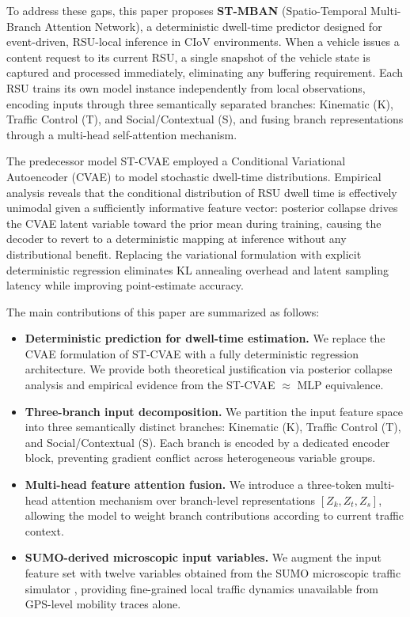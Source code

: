 \documentclass[journal]{IEEEtran}
\begin{document}
To address these gaps, this paper proposes \textbf{ST-MBAN} (Spatio-Temporal Multi-Branch Attention Network), a deterministic dwell-time predictor designed for event-driven, RSU-local inference in CIoV environments.
When a vehicle issues a content request to its current RSU, a single snapshot of the vehicle state is captured and processed immediately, eliminating any buffering requirement.
Each RSU trains its own model instance independently from local observations, encoding inputs through three semantically separated branches: Kinematic (K), Traffic Control (T), and Social/Contextual (S), and fusing branch representations through a multi-head self-attention mechanism.

\IEEEpubidadjcol
The predecessor model ST-CVAE \cite{STCVAE} employed a Conditional Variational Autoencoder (CVAE) to model stochastic dwell-time distributions.
Empirical analysis reveals that the conditional distribution of RSU dwell time is effectively unimodal given a sufficiently informative feature vector: posterior collapse \cite{posteriorCollapse} drives the CVAE latent variable toward the prior mean during training, causing the decoder to revert to a deterministic mapping at inference without any distributional benefit.
Replacing the variational formulation with explicit deterministic regression eliminates KL annealing overhead and latent sampling latency while improving point-estimate accuracy.

The main contributions of this paper are summarized as follows:

\begin{itemize}
    \item \textbf{Deterministic prediction for dwell-time estimation.}
    We replace the CVAE formulation of ST-CVAE with a fully deterministic regression architecture.
    We provide both theoretical justification via posterior collapse analysis and empirical evidence from the ST-CVAE $\approx$ MLP equivalence.

    \item \textbf{Three-branch input decomposition.}
    We partition the input feature space into three semantically distinct branches: Kinematic (K), Traffic Control (T), and Social/Contextual (S).
    Each branch is encoded by a dedicated encoder block, preventing gradient conflict across heterogeneous variable groups.

    \item \textbf{Multi-head feature attention fusion.}
    We introduce a three-token multi-head attention mechanism over branch-level representations $[Z_k, Z_t, Z_s]$, allowing the model to weight branch contributions according to current traffic context.

    \item \textbf{SUMO-derived microscopic input variables.}
    We augment the input feature set with twelve variables obtained from the SUMO microscopic traffic simulator \cite{SUMO}, providing fine-grained local traffic dynamics unavailable from GPS-level mobility traces alone.
\end{itemize}
\end{document}

